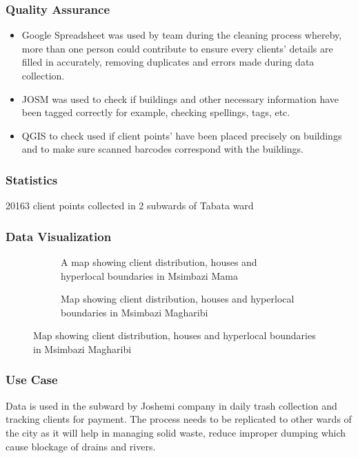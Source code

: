 \documentclass[a4paper,12pt,twoside]{article}
\begin{document}
\subsubsection{Quality Assurance}
\begin{itemize}
    \item Google Spreadsheet was used by team during the cleaning process whereby, more than one person could contribute to ensure every clients’ details are filled in accurately, removing duplicates and errors made during data collection.
    \item JOSM was used to check if buildings and other necessary information have been tagged correctly for example, checking spellings, tags, etc.
    \item QGIS to check used if client points' have been placed precisely on buildings and to make sure scanned barcodes correspond with the buildings.
\end{itemize}

\subsubsection{Statistics}
20163 client points collected in 2 subwards of Tabata ward

\newpage

\subsubsection{Data Visualization}
\begin{figure}
  \begin{subfigure}[b]{0.5\textwidth}
   \color{RHgreen}\caption{A map showing client distribution, houses and hyperlocal boundaries in Msimbazi Mama}
    \label{fig:1}
  \end{subfigure}
  \begin{subfigure}[b]{0.5\textwidth}
    \color{RHgreen}\caption{Map showing client distribution, houses and hyperlocal boundaries in Msimbazi Magharibi}
    \label{fig:2}
  \end{subfigure}
\end{figure}

\subsubsection{Use Case}
Data is used in the subward by Joshemi company in daily trash collection and tracking clients for payment. The process needs to be replicated to other wards of the city as it will help in managing solid waste, reduce improper dumping which cause blockage of drains and rivers. 
\end{document}

